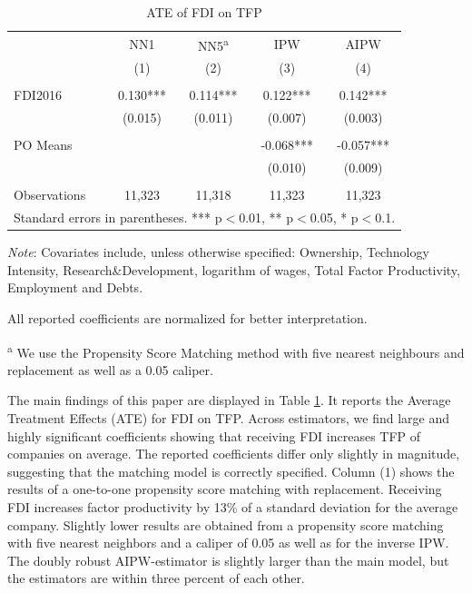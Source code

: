 \documentclass[a4paper,11pt]{scrartcl}
\begin{document}
\begin{table}[h]
 	\centering
   	\caption{ATE of FDI on TFP}
   	\label{tab:mainresults}
\begin{threeparttable}

\begin{tabular}{lcccc} 
	\hline
	\hline
 			& NN1 & NN5\textsuperscript{a} & IPW & AIPW \\
 			& (1) & (2) & (3)  & (4) \\ \hline
 			&  &  &  &    \\
FDI2016 	& 0.130*** & 0.114*** & 0.122***  & 0.142***   \\
 			& (0.015) & (0.011) & (0.007) &   (0.003)  \\
 	&  &  &  &    \\
PO Means 	& & & -0.068*** &  -0.057*** \\
			&  &  & (0.010)  &  (0.009) \\
			&  &  &  &    \\
 Observations & 11,323 & 11,318 & 11,323 & 11,323 \\ 
 	\hline
 	\hline
	\multicolumn{5}{c}{\footnotesize{Standard errors in parentheses. *** p$<$0.01, ** p$<$0.05, * p$<$0.1. }}
\end{tabular}

\begin{tablenotes}[flushleft]
      \footnotesize
\item \textit{Note}: Covariates include, unless otherwise specified: Ownership, Technology Intensity, Research\&Development, logarithm of wages, Total Factor Productivity, Employment and Debts. 
\item All reported coefficients are normalized for better interpretation. %
\item\textsuperscript{a} We use the Propensity Score Matching method with five nearest neighbours and replacement as well as a 0.05 caliper. 
\end{tablenotes}

\end{threeparttable}
\end{table}

The main findings of this paper are displayed in Table \ref{tab:mainresults}. It reports the Average Treatment Effects (ATE) for FDI on TFP. Across estimators, we find large and highly significant coefficients showing that receiving FDI increases TFP of companies on average. The reported coefficients differ only slightly in magnitude, suggesting that the matching model is correctly specified. 
Column (1) shows the results of a one-to-one propensity score matching with replacement. Receiving FDI  increases factor productivity by 13\% of a standard deviation for the average company. Slightly lower results are obtained from a propensity score matching with five nearest neighbors and a caliper of 0.05 as well as for the inverse IPW. The doubly robust AIPW-estimator is slightly larger than the main model, but the estimators are within three percent of each other.
\end{document}
